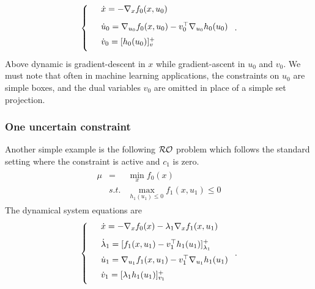 \documentclass[journal,twoside,web]{ieeecolor}
\begin{document}
\begin{align*}
\left\{
\begin{array}{cl}
\vspace{3mm}
&\dot{x}=-\nabla_x f_0(x,u_0)\\
\vspace{2mm}
&\dot{u}_0=\nabla_{u_0}f_0(x,u_0)-v_0^\top \nabla_{u_0} h_0(u_0)\\
\vspace{2mm}
&\dot{v}_0=[h_0(u_0)]_v^+
\end{array}\right..
\end{align*}
Above dynamic is gradient-descent in $x$ while gradient-ascent in $u_0$ and $v_0$. We must note that often in machine learning applications, the constraints on $u_0$ are simple boxes, and the dual variables $v_0$ are omitted in place of a simple set projection.

\subsubsection{One uncertain constraint}
Another simple example is the following ${\cal RO}$ problem which follows the standard setting where the constraint is active and $c_1$ is zero.
\begin{align*}
\begin{array}{lcl}\mu&=&\displaystyle\min_x f_0(x)\\
&s.t.&\displaystyle \max_{h_1(u_1)\leq 0}f_1(x,u_1)\leq 0
\end{array}
\end{align*}
The dynamical system equations are
\begin{align*}
\left\{
\begin{array}{cl}
\vspace{3mm}
&\dot{x}=-\nabla_x f_0(x)-\lambda_1 \nabla_x f_1(x,u_1)\\
\vspace{2mm}
&\dot{\lambda}_1=[f_1(x,u_1)-v_1^\top h_1(u_1)]_{\lambda_1}^+\\
\vspace{2mm}
&\dot{u}_1=\nabla_{u_1} f_1(x,u_1)-v_1^\top \nabla_{u_1}h_1(u_1)\\
\vspace{2mm}
&\dot{v}_1=[\lambda_1h_1(u_1)]_{v_1}^+
\end{array}\right..
\end{align*}
\end{document}
